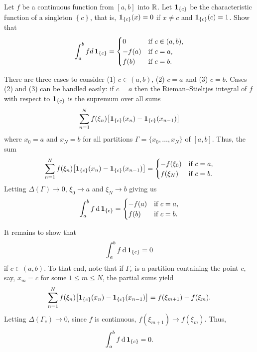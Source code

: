 \begin{problem}
  Let \(f\) be a continuous function from \([a,b]\) into \(\mathbb{R}\). Let
  \(\operatorname{\mathbf{1}}_{\{c\}}\) be the characteristic function of a singleton
  \(\left\{c\right\}\), that is, \(\operatorname{\mathbf{1}}_{\{c\}}(x)=0\) if \(x\neq c\) and
  \(\operatorname{\mathbf{1}}_{\{c\}}(c)=1\). Show that
  \[
    \int_a^b f d \operatorname{\mathbf{1}}_{\{c\}}=
    \begin{cases}
      0&\text{if \(c\in(a,b)\),}\\
      -f(a)&\text{if \(c=a\),}\\
      f(b)&\text{if \(c=b\).}
    \end{cases}
  \]
\end{problem}
\begin{solution}
  There are three cases to consider (1) \(c\in(a,b)\), (2) \(c=a\) and (3)
  \(c=b\). Cases (2) and (3) can be handled easily: if \(c=a\) then the
  Rieman--Stieltjes integral of \(f\) with respect to \(\operatorname{\mathbf{1}}_{\{c\}}\) is
  the supremum over all sums
  \[
    \sum_{n=1}^N f(\xi_n)\bigl[ \operatorname{\mathbf{1}}_{\{c\}}(x_n)-\operatorname{\mathbf{1}}_{\{c\}}(x_{n-1})\bigr]
  \]
  where \(x_0=a\) and \(x_N=b\) for all partitions
  \(\Gamma=\{x_0,\dotsc,x_N\}\) of \([a,b]\). Thus, the sum
  \[
    \sum_{n=1}^N
    f(\xi_n)\bigl[\operatorname{\mathbf{1}}_{\{c\}}(x_n)-\operatorname{\mathbf{1}}_{\{c\}}(x_{n-1})\bigr]
    =\begin{cases}
      -f(\xi_0)&\text{if \(c=a\),}\\
      f(\xi_N)&\text{if \(c=b\).}
    \end{cases}
  \]
  Letting \(\Delta(\Gamma)\to 0\), \(\xi_0\to a\) and \(\xi_N\to b\) giving
  us
  \[
    \int_a^b f \mathop{}\!\mathrm{d}\operatorname{\mathbf{1}}_{\{c\}}=
    \begin{cases}
      -f(a)&\text{if \(c=a\),}\\
      f(b)&\text{if \(c=b\).}
    \end{cases}
  \]

  It remains to show that
  \[
    \int_a^b f\mathop{}\!\mathrm{d}\operatorname{\mathbf{1}}_{\{c\}}=0
  \]
  if \(c\in(a,b)\). To that end, note that if \(\Gamma_c\) is a partition
  containing the point \(c\), say, \(x_m=c\) for some \(1\leq m\leq N\),
  the partial sums yield
  \[
    \sum_{n=1}^N
    f(\xi_n)\bigl[\operatorname{\mathbf{1}}_{\{c\}}(x_n)-\operatorname{\mathbf{1}}_{\{c\}}(x_{n-1})\bigr]
    =f(\xi_{m+1})-f(\xi_m).
  \]
  Letting \(\Delta(\Gamma_c)\to 0\), since \(f\) is continuous,
  \(f(\xi_{m+1})\to f(\xi_m)\). Thus,
  \[
    \int_a^b f\mathop{}\!\mathrm{d}\operatorname{\mathbf{1}}_{\{c\}}=0.
  \]
\end{solution}

